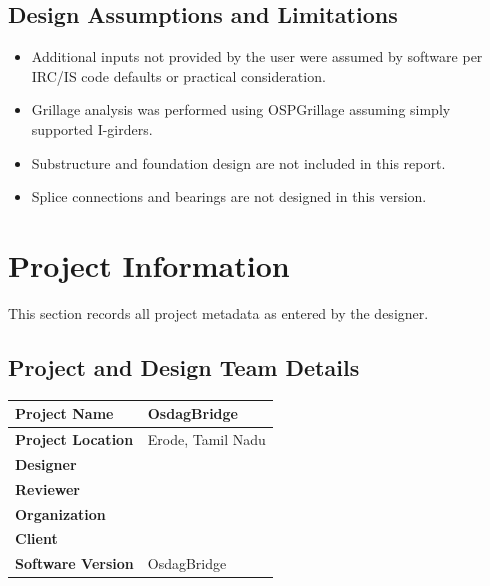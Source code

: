 \documentclass[12pt,a4paper]{report}
\numberwithin{table}{chapter}
\numberwithin{figure}{chapter}
\begin{document}
\section*{Design Assumptions and Limitations}
\label{sec:assumptions}

\begin{itemize}
\item Additional inputs not provided by the user were assumed by software per IRC/IS code defaults or practical consideration.
\item Grillage analysis was performed using OSPGrillage assuming simply supported I-girders.
\item Substructure and foundation design are not included in this report.
\item Splice connections and bearings are not designed in this version.
\end{itemize}

\titleformat{\chapter}[block]{\normalfont\Large\bfseries\centering}{\thechapter}{1em}{}
\titlespacing*{\chapter}{0pt}{-30pt}{10pt}


\chapter{Project Information}

This section records all project metadata as entered by the designer.

\section{Project and Design Team Details}
\label{sec:project-details}

\begin{tabular}{|L{5.5cm}|L{8.5cm}|}
\hline
\textbf{Project Name} & OsdagBridge \\
\hline
\textbf{Project Location} & Erode, Tamil Nadu \\
\hline
\textbf{Designer} &  \\
\hline
\textbf{Reviewer} &  \\
\hline
\textbf{Organization} &  \\
\hline
\textbf{Client} &  \\
\hline
\textbf{Software Version} & OsdagBridge \\
\hline
\end{tabular}
\end{document}
